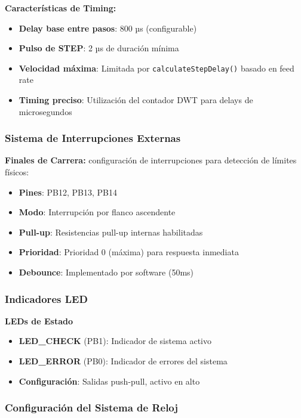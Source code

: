 \documentclass[12pt]{article}
\begin{document}
\textbf{Características de Timing:}
\begin{itemize}
    \item \textbf{Delay base entre pasos}: 800 µs (configurable)
    \item \textbf{Pulso de STEP}: 2 µs de duración mínima
    \item \textbf{Velocidad máxima}: Limitada por \texttt{calculateStepDelay()} basado en feed rate
    \item \textbf{Timing preciso}: Utilización del contador DWT para delays de microsegundos
\end{itemize}

\subsubsection{Sistema de Interrupciones Externas}

\textbf{Finales de Carrera:} configuración de interrupciones para detección de límites físicos:

\begin{itemize}
    \item \textbf{Pines}: PB12, PB13, PB14
    \item \textbf{Modo}: Interrupción por flanco ascendente
    \item \textbf{Pull-up}: Resistencias pull-up internas habilitadas
    \item \textbf{Prioridad}: Prioridad 0 (máxima) para respuesta inmediata
    \item \textbf{Debounce}: Implementado por software (50ms)
\end{itemize}

\subsubsection{Indicadores LED}

\textbf{LEDs de Estado}
\begin{itemize}
    \item \textbf{LED\_CHECK} (PB1): Indicador de sistema activo
    \item \textbf{LED\_ERROR} (PB0): Indicador de errores del sistema
    \item \textbf{Configuración}: Salidas push-pull, activo en alto
\end{itemize}

\subsubsection{Configuración del Sistema de Reloj}
\end{document}
